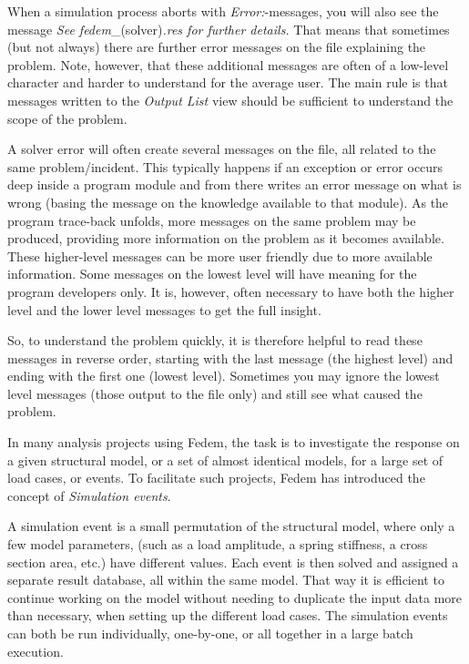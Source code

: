 {When a simulation process aborts with {\sl Error:}-messages, you will also see
the message {\sl See fedem}\_(solver){\sl .res for further details.}
That means that sometimes (but not always) there are further error messages
on the  file explaining the problem.
Note, however, that these additional messages are often of a low-level
character and harder to understand for the average user.
The main rule is that messages written to the {\sl Output List} view should be
sufficient to understand the scope of the problem.


A solver error will often create several messages on the  file,
all related to the same problem/incident. This typically happens if an exception
or error occurs deep inside a program module and from there writes an error
message on what is wrong (basing the message on the knowledge available to that
module). As the program trace-back unfolds, more messages on the same problem
may be produced, providing more information on the problem as it becomes
available. These higher-level messages can be more user friendly due to more
available information. Some messages on the lowest level will have meaning for
the program developers only. It is, however, often necessary to have both the
higher level and the lower level messages to get the full insight.

So, to understand the problem quickly, it is therefore helpful to read these
messages in reverse order, starting with the last message (the highest level)
and ending with the first one (lowest level). Sometimes you may ignore the
lowest level messages (those output to the  file only)
and still see what caused the problem.



In many analysis projects using Fedem, the task is to investigate the response
on a given structural model, or a set of almost identical models,
for a large set of load cases, or events. To facilitate such projects,
Fedem has introduced the concept of {\sl Simulation events}.

A simulation event is a small permutation of the structural model, where only a
few model parameters, (such as a load amplitude, a spring stiffness, a cross
section area, etc.) have different values. Each event is then solved and
assigned a separate result database, all within the same model.
That way it is efficient to continue working on the model without needing to
duplicate the input data more than necessary, when setting up the different
load cases. The simulation events can both be run individually, one-by-one,
or all together in a large batch execution.


}
